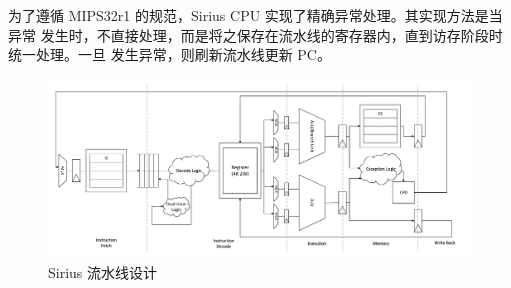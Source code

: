 \documentclass[blue,normal,cn]{elegantbook}
\begin{document}
为了遵循 MIPS32r1 的规范，Sirius CPU 实现了精确异常处理。其实现方法是当异常
发生时，不直接处理，而是将之保存在流水线的寄存器内，直到访存阶段时统一处理。一旦
发生异常，则刷新流水线更新 PC。

\begin{landscape}\centering
    \vspace*{\fill}
    \begin{figure}[htpb]
        \centering
        \includegraphics[width=1.65\textwidth]{figures/Sirius.pdf}
        \caption{Sirius 流水线设计}
        \label{fig:Test}
    \end{figure}
    \vfill
\end{landscape}
\end{document}
